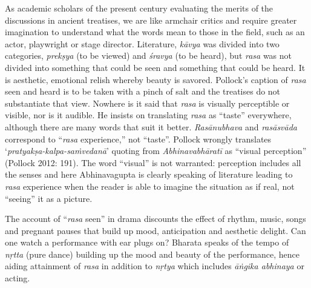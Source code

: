 As academic scholars of the present century evaluating the merits of the discussions in ancient treatises, we are like armchair critics and require greater imagination to understand what the words mean to those in the field, such as an actor, playwright or stage director. Literature, \textit{kāvya} was divided into two categories, \textit{prekṣya} (to be viewed) and \textit{śravya} (to be heard), but \textit{rasa} was not divided into something that could be seen and something that could be heard. It is aesthetic, emotional relish whereby beauty is savored. Pollock’s caption of \textit{rasa} seen and heard is to be taken with a pinch of salt and the treatises do not substantiate that view. Nowhere is it said that \textit{rasa} is visually perceptible or visible, nor is it audible. He insists on translating \textit{rasa} as “taste” everywhere, although there are many words that suit it better. \textit{Rasānubhava} and \textit{rasāsvāda} correspond to “\textit{rasa} experience,” not “taste”. Pollock wrongly translates ‘\textit{pratyakṣa-kalpa-saṁvedanā}’ quoting from \textit{Abhinavabhāratī} as “visual perception” (Pollock 2012: 191). The word “visual” is not warranted: perception includes all the senses and here Abhinavagupta is clearly speaking of literature leading to \textit{rasa} experience when the reader is able to imagine the situation as if real, not “seeing” it as a picture.

The account of “\textit{rasa} seen” in drama discounts the effect of rhythm, music, songs and pregnant pauses that build up mood, anticipation and aesthetic delight. Can one watch a performance with ear plugs on? Bharata speaks of the tempo of \textit{nṛtta} (pure dance) building up the mood and beauty of the performance, hence aiding attainment of \textit{rasa} in addition to \textit{nṛtya} which includes \textit{āṅgika abhinaya} or acting.

